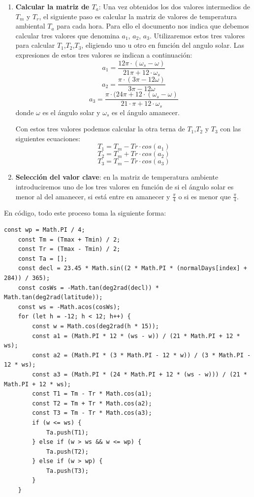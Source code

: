 \begin{enumerate}
\item \textbf{Calcular la matriz de $T_a$}: Una vez obtenidos los dos valores intermedios de $T_m$ y $T_r$, el siguiente paso es calcular la matriz de valores de temperatura ambiental $T_a$ para cada hora. Para ello el documento nos indica que debemos calcular tres valores que denomina $a_1$, $a_2$, $a_3$. Utilizaremos estos tres valores para calcular $T_1$,$T_2$,$T_3$, eligiendo uno u otro en función del angulo solar. Las expresiones de estos tres valores se indican a continuación:
\begin{equation}
a_1 = \frac{12\pi \cdot (\omega_s - \omega)}{21 \pi + 12 \cdot \omega_s}
\end{equation}
\begin{equation}
a_2 = \frac{\pi \cdot (3\pi - 12\omega)}{3\pi - 12\omega}
\end{equation}
\begin{equation}
a_3 = \frac{\pi \cdot (24\pi +  12 \cdot (\omega_s - \omega) }{21 \cdot \pi + 12 \cdot \omega_s}
\end{equation}
donde $\omega$ es el ángulo solar y $\omega_s$ es el ángulo amanecer.

Con estos tres valores podemos calcular la otra terna de $T_1$,$T_2$ y $T_3$ con las siguientes ecuaciones:
\begin{equation}
T_1 = T_m - Tr \cdot cos(a_1)
\end{equation}
\begin{equation}
T_2 = T_m + Tr \cdot cos(a_2)
\end{equation}
\begin{equation}
T_3 = T_m - Tr \cdot cos(a_3)
\end{equation}

\item \textbf{Selección del valor clave}: en la matriz de temperatura ambiente introduciremos uno de los tres valores en función de si el ángulo solar es menor al del amanecer, si está entre en amanecer y $\frac{\pi}{4}$ o si es menor que $\frac{\pi}{4}$.

\end{enumerate}

En código, todo este proceso toma la siguiente forma:
\begin{lstlisting}[style=ES6, caption={Cálculo de la temperatura ambiente}]
	const wp = Math.PI / 4;
	const Tm = (Tmax + Tmin) / 2;
	const Tr = (Tmax - Tmin) / 2;
	const Ta = [];
	const decl = 23.45 * Math.sin((2 * Math.PI * (normalDays[index] + 284)) / 365);
	const cosWs = -Math.tan(deg2rad(decl)) * Math.tan(deg2rad(latitude));
	const ws = -Math.acos(cosWs);
	for (let h = -12; h < 12; h++) {
		const w = Math.cos(deg2rad(h * 15));
		const a1 = (Math.PI * 12 * (ws - w)) / (21 * Math.PI + 12 * ws);
		const a2 = (Math.PI * (3 * Math.PI - 12 * w)) / (3 * Math.PI - 12 * ws);
		const a3 = (Math.PI * (24 * Math.PI + 12 * (ws - w))) / (21 * Math.PI + 12 * ws);
		const T1 = Tm - Tr * Math.cos(a1);
		const T2 = Tm + Tr * Math.cos(a2);
		const T3 = Tm - Tr * Math.cos(a3);
		if (w <= ws) {
			Ta.push(T1);
		} else if (w > ws && w <= wp) {
			Ta.push(T2);
		} else if (w > wp) {
			Ta.push(T3);
		}
	}
\end{lstlisting}

